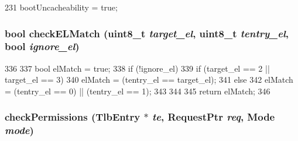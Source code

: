 \begin{DoxyCode}
231 { bootUncacheability = true; }
\end{DoxyCode}
\hypertarget{classArmISA_1_1TLB_a58d5b81b2c0a67f5780f391dfea47e3a}{
\subsubsection[{checkELMatch}]{\setlength{\rightskip}{0pt plus 5cm}bool checkELMatch (uint8\_\-t {\em target\_\-el}, \/  uint8\_\-t {\em tentry\_\-el}, \/  bool {\em ignore\_\-el})}}
\label{classArmISA_1_1TLB_a58d5b81b2c0a67f5780f391dfea47e3a}



\begin{DoxyCode}
336 {
337     bool elMatch = true;
338     if (!ignore_el) {
339         if (target_el == 2 || target_el == 3) {
340             elMatch = (tentry_el  == target_el);
341         } else {
342             elMatch = (tentry_el == 0) || (tentry_el  == 1);
343         }
344     }
345     return elMatch;
346 }
\end{DoxyCode}
\hypertarget{classArmISA_1_1TLB_a5a4e92c7787e92910f8ad62cb4f1bf5f}{
\subsubsection[{checkPermissions}]{ checkPermissions ({\bf TlbEntry} $\ast$ {\em te}, \/  {\bf RequestPtr} {\em req}, \/  {\bf Mode} {\em mode})}}
\label{classArmISA_1_1TLB_a5a4e92c7787e92910f8ad62cb4f1bf5f}



